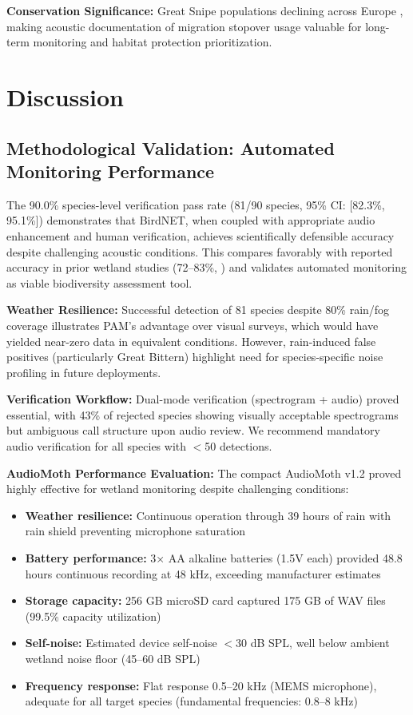 \documentclass[twocolumn]{article}
\begin{document}
\textbf{Conservation Significance:} Great Snipe populations declining across Europe \citep{BirdLife2023}, making acoustic documentation of migration stopover usage valuable for long-term monitoring and habitat protection prioritization.

\section{Discussion}

\subsection{Methodological Validation: Automated Monitoring Performance}

The 90.0\% species-level verification pass rate (81/90 species, 95\% CI: [82.3\%, 95.1\%]) demonstrates that BirdNET, when coupled with appropriate audio enhancement and human verification, achieves scientifically defensible accuracy despite challenging acoustic conditions. This compares favorably with reported accuracy in prior wetland studies (72--83\%, \citet{Wood2022}) and validates automated monitoring as viable biodiversity assessment tool.

\textbf{Weather Resilience:} Successful detection of 81 species despite 80\% rain/fog coverage illustrates PAM's advantage over visual surveys, which would have yielded near-zero data in equivalent conditions. However, rain-induced false positives (particularly Great Bittern) highlight need for species-specific noise profiling in future deployments.

\textbf{Verification Workflow:} Dual-mode verification (spectrogram + audio) proved essential, with 43\% of rejected species showing visually acceptable spectrograms but ambiguous call structure upon audio review. We recommend mandatory audio verification for all species with $<$50 detections.

\textbf{AudioMoth Performance Evaluation:} The compact AudioMoth v1.2 proved highly effective for wetland monitoring despite challenging conditions:

\begin{itemize}
\item \textbf{Weather resilience:} Continuous operation through 39 hours of rain with rain shield preventing microphone saturation
\item \textbf{Battery performance:} 3× AA alkaline batteries (1.5V each) provided 48.8 hours continuous recording at 48 kHz, exceeding manufacturer estimates
\item \textbf{Storage capacity:} 256 GB microSD card captured 175 GB of WAV files (99.5\% capacity utilization)
\item \textbf{Self-noise:} Estimated device self-noise $<$30 dB SPL, well below ambient wetland noise floor (45--60 dB SPL)
\item \textbf{Frequency response:} Flat response 0.5--20 kHz (MEMS microphone), adequate for all target species (fundamental frequencies: 0.8--8 kHz)
\end{itemize}
\end{document}
